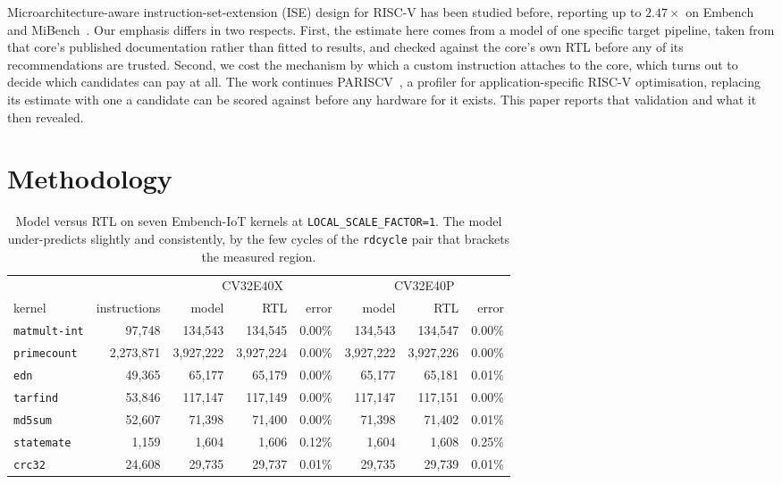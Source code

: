 \documentclass[conference,10pt]{IEEEtran}
\begin{document}
Microarchitecture-aware instruction-set-extension (ISE) design for RISC-V has
been studied before, reporting up to $2.47\times$ on Embench and
MiBench~\cite{rezunov}. Our emphasis differs in two respects. First, the estimate
here comes from a model of one specific target pipeline, taken from that core's
published documentation rather than fitted to results, and checked against the
core's own RTL before any of its recommendations are trusted. Second, we cost the
mechanism by which a custom instruction attaches to the core, which turns out to
decide which candidates can pay at all. The work continues
PARISCV~\cite{pariscv1}, a profiler for application-specific RISC-V
optimisation, replacing its estimate with one a candidate can be scored against
before any hardware for it exists. This paper reports that validation and what it
then revealed.

\section{Methodology}

\begin{table}[!t]
\centering
\caption{Model versus RTL on seven Embench-IoT kernels at
\texttt{LOCAL\_SCALE\_FACTOR=1}. The model under-predicts slightly and
consistently, by the few cycles of the \texttt{rdcycle} pair that brackets the
measured region.}
\label{tab:val}
\footnotesize
\setlength{\tabcolsep}{6pt}
\begin{tabular}{@{}lrrrrrrr@{}}
\toprule
& & \multicolumn{3}{c}{CV32E40X} & \multicolumn{3}{c}{CV32E40P}\\
\cmidrule(lr){3-5}\cmidrule(lr){6-8}
kernel & instructions & model & RTL & error & model & RTL & error\\
\midrule
\texttt{matmult-int} & 97{,}748      & 134{,}543   & 134{,}545   & 0.00\% & 134{,}543   & 134{,}547   & 0.00\%\\
\texttt{primecount}  & 2{,}273{,}871 & 3{,}927{,}222 & 3{,}927{,}224 & 0.00\% & 3{,}927{,}222 & 3{,}927{,}226 & 0.00\%\\
\texttt{edn}         & 49{,}365      & 65{,}177    & 65{,}179    & 0.00\% & 65{,}177    & 65{,}181    & 0.01\%\\
\texttt{tarfind}     & 53{,}846      & 117{,}147   & 117{,}149   & 0.00\% & 117{,}147   & 117{,}151   & 0.00\%\\
\texttt{md5sum}      & 52{,}607      & 71{,}398    & 71{,}400    & 0.00\% & 71{,}398    & 71{,}402    & 0.01\%\\
\texttt{statemate}   & 1{,}159       & 1{,}604     & 1{,}606     & 0.12\% & 1{,}604     & 1{,}608     & 0.25\%\\
\texttt{crc32}       & 24{,}608      & 29{,}735    & 29{,}737    & 0.01\% & 29{,}735    & 29{,}739    & 0.01\%\\
\bottomrule
\end{tabular}
\end{table}
\end{document}
